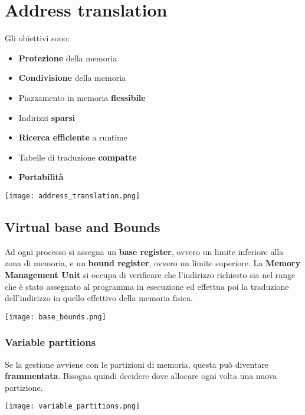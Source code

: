 \newpage
\section{Address translation}
Gli obiettivi sono:
\begin{itemize}
	\item \textbf{Protezione} della memoria
	\item \textbf{Condivisione} della memoria
	\item Piazzamento in memoria \textbf{flessibile}
	\item Indirizzi \textbf{sparsi}
	\item \textbf{Ricerca efficiente} a runtime
	\item Tabelle di traduzione \textbf{compatte}
	\item \textbf{Portabilità}
\end{itemize}
\begin{center}
	\texttt{[image: address\_translation.png]}
\end{center}
\subsection{Virtual base and Bounds}
Ad ogni processo si assegna un \textbf{base register}, ovvero un limite inferiore alla zona di memoria, e un \textbf{bound register}, ovvero un limite superiore.
La \textbf{Memory Management Unit} si occupa di verificare che l'indirizzo richiesto sia nel range che è stato assegnato al programma in esecuzione ed effettua poi la traduzione dell'indirizzo in quello effettivo della memoria fisica.
\begin{center}
	\texttt{[image: base\_bounds.png]}
\end{center}
\subsubsection{Variable partitions}
Se la gestione avviene con le partizioni di memoria, questa può diventare \textbf{frammentata}. Bisogna quindi decidere dove allocare ogni volta una nuova partizione.
\begin{center}
	\texttt{[image: variable\_partitions.png]}
\end{center}

